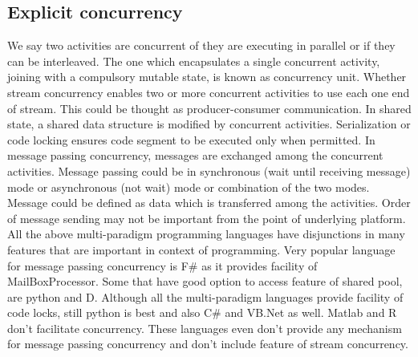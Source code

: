 \documentclass{sig-alternate}
\begin{document}
\subsection{Explicit concurrency}
We say two activities are concurrent of they are executing in parallel or if they can be interleaved. The one which encapsulates a single concurrent activity, joining with a compulsory mutable state, is known as concurrency unit. Whether stream concurrency enables two or more concurrent activities to use each one end of stream. This could be thought as producer-consumer communication. In shared state, a shared data structure is modified by concurrent activities. Serialization or code locking ensures code segment to be executed only when permitted. In message passing concurrency, messages are exchanged among the concurrent activities. Message passing could be in synchronous (wait until receiving message) mode or asynchronous (not wait) mode or combination of the two modes. Message could be defined as data which is transferred among the activities. Order of message sending may not be important from the point of underlying platform.
All the above multi-paradigm programming languages have disjunctions in many features that are important in context of programming. Very popular language for message passing concurrency is F# as it provides facility of MailBoxProcessor. Some that have good option to access feature of shared pool, are python and D. Although all the multi-paradigm languages provide facility of code locks, still python is best and also C# and VB.Net as well. Matlab and R don’t facilitate concurrency. These languages even don’t provide any mechanism for message passing concurrency and don’t include feature of stream concurrency.
\end{document}
